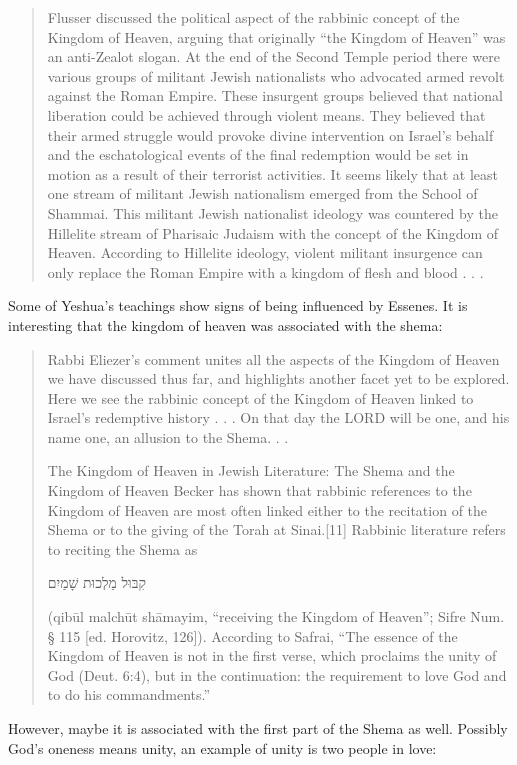 \documentclass[11pt]{article}
\begin{document}
\begin{quote}
Flusser discussed the political aspect of the rabbinic concept of the Kingdom of Heaven, arguing that originally “the Kingdom of Heaven” was an anti-Zealot slogan. At the end of the Second Temple period there were various groups of militant Jewish nationalists who advocated armed revolt against the Roman Empire. These insurgent groups believed that national liberation could be achieved through violent means. They believed that their armed struggle would provoke divine intervention on Israel’s behalf and the eschatological events of the final redemption would be set in motion as a result of their terrorist activities. It seems likely that at least one stream of militant Jewish nationalism emerged from the School of Shammai. This militant Jewish nationalist ideology was countered by the Hillelite stream of Pharisaic Judaism with the concept of the Kingdom of Heaven. According to Hillelite ideology, violent militant insurgence can only replace the Roman Empire with a kingdom of flesh and blood . . . 
\cite{kingdom of heaven jp}
\end{quote} 
Some of Yeshua's teachings show signs of being influenced by Essenes. It is interesting that the kingdom of heaven was associated with the shema:
\begin{quote}
Rabbi Eliezer’s comment unites all the aspects of the Kingdom of Heaven we have discussed thus far, and highlights another facet yet to be explored. Here we see the rabbinic concept of the Kingdom of Heaven linked to Israel’s redemptive history . . . On that day the LORD will be one, and his name one, an allusion to the Shema. . .

The Kingdom of Heaven in Jewish Literature: The Shema and the Kingdom of Heaven
Becker has shown that rabbinic references to the Kingdom of Heaven are most often linked either to the recitation of the Shema or to the giving of the Torah at Sinai.[11] Rabbinic literature refers to reciting the Shema as\begin{hebrew} קִבּוּל מַלְכוּת שָׁמַיִם  \end{hebrew} (qibūl malchūt shāmayim, “receiving the Kingdom of Heaven”; Sifre Num. § 115 [ed. Horovitz, 126]). According to Safrai, “The essence of the Kingdom of Heaven is not in the first verse, which proclaims the unity of God (Deut. 6:4), but in the continuation: the requirement to love God and to do his commandments.” \cite{kingdom of heaven jp}
\end{quote} 
However, maybe it is associated with the first part of the Shema as well. Possibly God's oneness means unity, an example of unity is two people in love:
\end{document}
